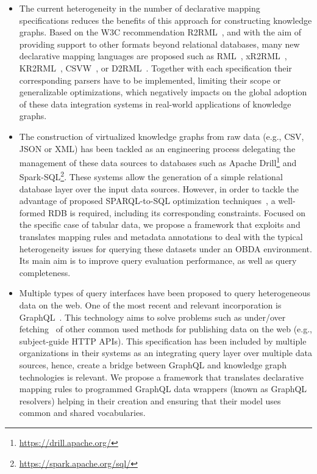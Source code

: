 \begin{itemize}
    \item The current heterogeneity in the number of declarative mapping specifications reduces the benefits of this approach for constructing knowledge graphs. Based on the W3C recommendation R2RML~\citep{R2RML}, and with the aim of providing support to other formats beyond relational databases, many new declarative mapping languages are proposed such as RML~\citep{dimou2014rml}, xR2RML~\citep{michel2015translation}, KR2RML~\citep{slepicka2015kr2rml}, CSVW~\citep{tennison2015model}, or D2RML~\citep{chortaras2018mapping}. Together with each specification their corresponding parsers have to be implemented, limiting their scope or generalizable optimizations, which negatively impacts on the global adoption of these data integration systems in real-world applications of knowledge graphs.

    \item The construction of virtualized knowledge graphs from raw data (e.g., CSV, JSON or XML) has been tackled as an engineering process delegating the management of these data sources to databases such as Apache Drill\footnote{\url{https://drill.apache.org/}} and Spark-SQL\footnote{\url{https://spark.apache.org/sql/}}. These systems allow the generation of a simple relational database layer over the input data sources. However, in order to tackle the advantage of proposed SPARQL-to-SQL optimization techniques~\citep{priyatna2014formalisation,calvanese2017ontop}, a well-formed RDB is required, including its corresponding constraints. Focused on the specific case of tabular data, we propose a framework that exploits and translates mapping rules and metadata annotations to deal with the typical heterogeneity issues for querying these datasets under an OBDA environment. Its main aim is to improve query evaluation performance, as well as query completeness.
   
    \item Multiple types of query interfaces have been proposed to query heterogeneous data on the web. One of the most recent and relevant incorporation is GraphQL~\citep{graphql}. This technology aims to solve problems such as under/over fetching~\citep{bryant2017graphql,vogel2017experiences,mukhiya2019graphql} of other common used methods for publishing data on the web (e.g., subject-guide HTTP APIs). This specification has been included by multiple organizations in their systems as an integrating query layer over multiple data sources, hence, create a bridge between GraphQL and knowledge graph technologies is relevant. We propose a framework that translates declarative mapping rules to programmed GraphQL data wrappers (known as GraphQL resolvers) helping in their creation and ensuring that their model uses common and shared vocabularies.
\end{itemize}


